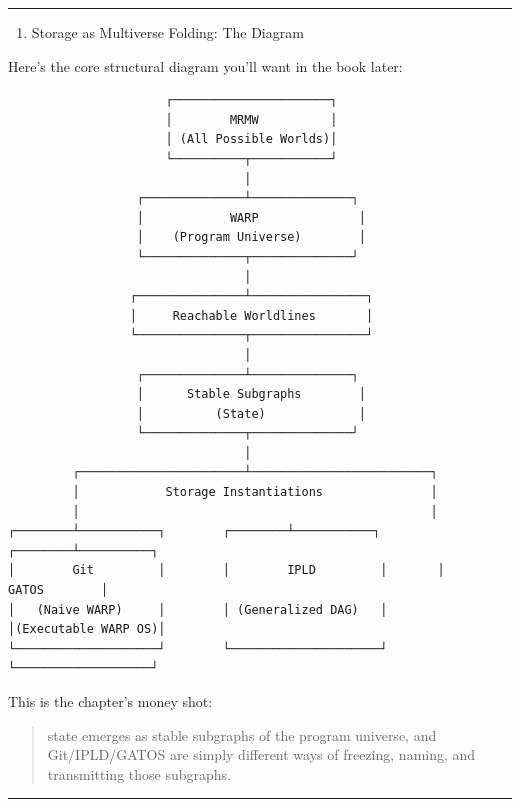 \begin{center}\rule{0.5\linewidth}{0.5pt}\end{center}

\begin{enumerate}
\def\labelenumi{\arabic{enumi}.}
\setcounter{enumi}{5}
\tightlist
\item
  Storage as Multiverse Folding: The Diagram
\end{enumerate}

Here's the core structural diagram you'll want in the book later:

\begin{lstlisting}
                      ┌──────────────────────┐
                      │        MRMW          │
                      │ (All Possible Worlds)│
                      └──────────┬───────────┘
                                 │
                  ┌──────────────┴──────────────┐
                  │            WARP              │
                  │    (Program Universe)        │
                  └──────────────┬──────────────┘
                                 │
                 ┌───────────────┴────────────────┐
                 │     Reachable Worldlines       │
                 └───────────────┬────────────────┘
                                 │
                  ┌──────────────┴──────────────┐
                  │      Stable Subgraphs        │
                  │          (State)             │
                  └──────────────┬──────────────┘
                                 │
         ┌───────────────────────┴─────────────────────────┐
         │            Storage Instantiations               │
         │                                                 │
┌────────┴───────────┐        ┌────────┴───────────┐       ┌────────┴──────────┐
│        Git         │        │        IPLD         │       │      GATOS        │
│   (Naive WARP)     │        │ (Generalized DAG)   │       │(Executable WARP OS)│
└────────────────────┘        └─────────────────────┘       └───────────────────┘
\end{lstlisting}

This is the chapter's money shot:

\begin{quote}
state emerges as stable subgraphs of the program universe, and
Git/IPLD/GATOS are simply different ways of freezing, naming, and
transmitting those subgraphs.
\end{quote}

\begin{center}\rule{0.5\linewidth}{0.5pt}\end{center}

